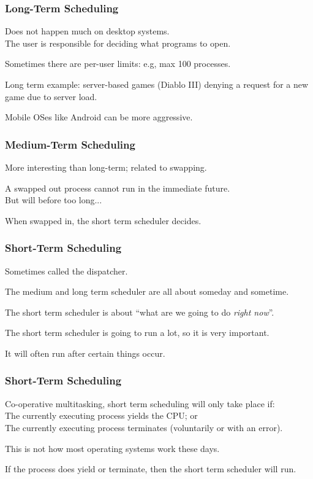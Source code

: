 \begin{frame}
\frametitle{Long-Term Scheduling}
Does not happen much on desktop systems.\\
\quad The user is responsible for deciding what programs to open.

Sometimes there are per-user limits: e.g, max 100 processes.

Long term example: server-based games (Diablo III) denying a request for a new game due to server load.

Mobile OSes like Android can be more aggressive.


\end{frame}

\begin{frame}
\frametitle{Medium-Term Scheduling}

More interesting than long-term; related to swapping.

A swapped out process cannot run in the immediate future.\\
\quad But will before too long...

When swapped in, the short term scheduler decides.

\end{frame}

\begin{frame}
\frametitle{Short-Term Scheduling}
Sometimes called the \alert{dispatcher}. 

The medium and long term scheduler are all about someday and sometime. 

The short term scheduler is about ``what are we going to do \textit{right now}''. 

The short term scheduler is going to run a lot, so it is very important. 

It will often run after certain things occur. 


\end{frame}

\begin{frame}
\frametitle{Short-Term Scheduling}

Co-operative multitasking, short term scheduling will only take place if:\\
\quad The currently executing process yields the CPU; or\\
\quad The currently executing process terminates (voluntarily or with an error). 

This is not how most operating systems work these days. 

If the process does yield or terminate, then the short term scheduler will run.

\end{frame}

